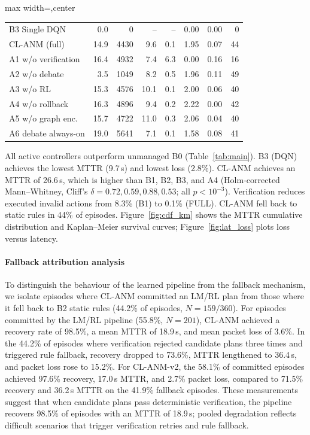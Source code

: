 \documentclass[sn-mathphys,Numbered]{sn-jnl}
\begin{document}
\begin{table}[t]
\begin{adjustbox}{max width=\textwidth,center}
\begin{tabular}{lrrrrrrr}
B3 Single DQN & 0.0 & 0 & -- & -- & 0.00 & 0.00 & 0 \\
CL-ANM (full) & 14.9 & 4430 & 9.6 & 0.1 & 1.95 & 0.07 & 44 \\
A1 w/o verification & 16.4 & 4932 & 7.4 & 6.3 & 0.00 & 0.16 & 16 \\
A2 w/o debate & 3.5 & 1049 & 8.2 & 0.5 & 1.96 & 0.11 & 49 \\
A3 w/o RL & 15.3 & 4576 & 10.1 & 0.1 & 2.00 & 0.06 & 40 \\
A4 w/o rollback & 16.3 & 4896 & 9.4 & 0.2 & 2.22 & 0.00 & 42 \\
A5 w/o graph enc. & 15.7 & 4722 & 11.0 & 0.3 & 2.06 & 0.04 & 40 \\
A6 debate always-on & 19.0 & 5641 & 7.1 & 0.1 & 1.58 & 0.08 & 41 \\
\bottomrule
\end{tabular}
\end{adjustbox}
\end{table}

All active controllers outperform unmanaged B0 (Table~\ref{tab:main}). B3 (DQN) achieves the lowest MTTR (9.7\,s) and lowest loss (2.8\%). CL-ANM achieves an MTTR of 26.6\,s, which is higher than B1, B2, B3, and A4 (Holm-corrected Mann--Whitney, Cliff's $\delta = 0.72, 0.59, 0.88, 0.53$; all $p{<}10^{-3}$). Verification reduces executed invalid actions from 8.3\% (B1) to 0.1\% (FULL). CL-ANM fell back to static rules in 44\% of episodes. Figure~\ref{fig:cdf_km} shows the MTTR cumulative distribution and Kaplan--Meier survival curves; Figure~\ref{fig:lat_loss} plots loss versus latency.

\paragraph{Fallback attribution analysis} To distinguish the behaviour of the learned pipeline from the fallback mechanism, we isolate episodes where CL-ANM committed an LM/RL plan from those where it fell back to B2 static rules (44.2\% of episodes, $N{=}159/360$). For episodes committed by the LM/RL pipeline (55.8\%, $N{=}201$), CL-ANM achieved a recovery rate of 98.5\%, a mean MTTR of 18.9\,s, and mean packet loss of 3.6\%. In the 44.2\% of episodes where verification rejected candidate plans three times and triggered rule fallback, recovery dropped to 73.6\%, MTTR lengthened to 36.4\,s, and packet loss rose to 15.2\%. For CL-ANM-v2, the 58.1\% of committed episodes achieved 97.6\% recovery, 17.0\,s MTTR, and 2.7\% packet loss, compared to 71.5\% recovery and 36.2\,s MTTR on the 41.9\% fallback episodes. These measurements suggest that when candidate plans pass deterministic verification, the pipeline recovers 98.5\% of episodes with an MTTR of 18.9\,s; pooled degradation reflects difficult scenarios that trigger verification retries and rule fallback.
\end{document}
